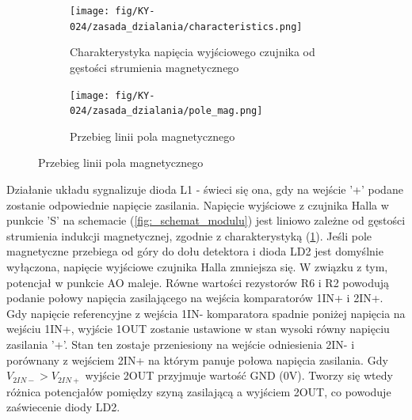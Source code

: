 \documentclass[11pt, a4paper]{article}
\begin{document}
\vspace{0.25cm}
\begin{figure}[h]
\centering
\begin{subfigure}{.47\textwidth}
\centering
\texttt{[image: fig/KY-024/zasada\_dzialania/characteristics.png]}
\caption{\centering Charakterystyka napięcia wyjściowego czujnika od gęstości strumienia magnetycznego \cite{49E_datasheet}}
\label{fig:_charakterystyka}
\end{subfigure}%
\begin{subfigure}{.6\textwidth}
\centering
\texttt{[image: fig/KY-024/zasada\_dzialania/pole\_mag.png]}
\caption{Przebieg linii pola magnetycznego }
\label{fig:_zasada_pole_mag}
\end{subfigure}
\label{fig:element}
\end{figure}
\vspace{0.25cm}
Działanie układu sygnalizuje dioda L1 - świeci się ona, gdy na wejście '+' podane zostanie odpowiednie napięcie zasilania. Napięcie wyjściowe z czujnika Halla w punkcie 'S' na schemacie (\ref{fig:_schemat_modulu}) jest liniowo zależne od gęstości strumienia indukcji magnetycznej, zgodnie z charakterystyką (\ref{fig:_charakterystyka}). Jeśli pole magnetyczne przebiega od góry do dołu detektora i dioda LD2 jest domyślnie wyłączona, napięcie wyjściowe czujnika Halla zmniejsza się. W związku z tym, potencjał w punkcie AO maleje. Równe wartości rezystorów R6 i R2 powodują podanie połowy napięcia zasilającego na wejścia komparatorów 1IN+ i 2IN+. Gdy napięcie referencyjne z wejścia 1IN- komparatora spadnie poniżej napięcia na wejściu 1IN+, wyjście 1OUT zostanie ustawione w stan wysoki równy napięciu zasilania '+'. Stan ten zostaje przeniesiony na wejście odniesienia 2IN- i porównany z wejściem 2IN+ na którym panuje połowa napięcia zasilania. Gdy $V_{2IN-} > V_{2IN+}$ wyjście 2OUT przyjmuje wartość GND (0V). Tworzy się wtedy różnica potencjałów pomiędzy szyną zasilającą a wyjściem 2OUT, co powoduje zaświecenie diody LD2.


\newpage
\end{document}
